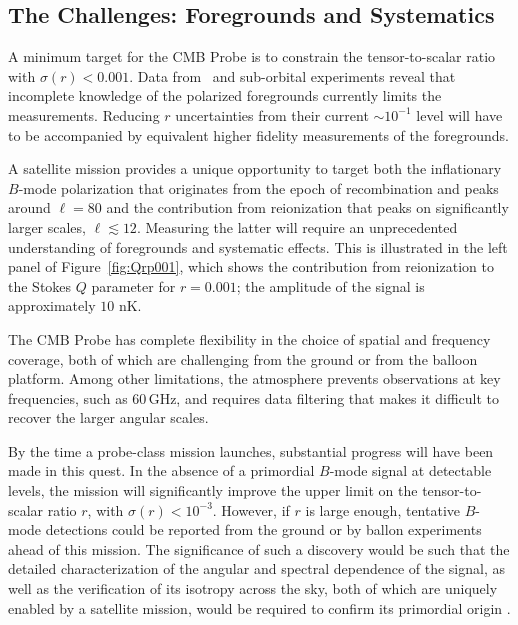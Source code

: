 \subsection{The Challenges: Foregrounds and Systematics}
\label{sec:foregrounds}
\vspace{-0.05in}

A minimum target for the CMB Probe is to constrain the tensor-to-scalar ratio with $\sigma(r) < 0.001$. Data from \planck\ and 
sub-orbital experiments reveal that incomplete knowledge of the polarized foregrounds currently limits the measurements. 
Reducing $r$ uncertainties from their current $\sim\!10^{-1}$ level will have to be accompanied by equivalent higher fidelity measurements of the foregrounds.

A satellite mission provides a unique opportunity to target both the inflationary $B$-mode polarization that originates from the epoch of recombination and peaks around $\ell=80$ and the contribution from reionization that peaks on significantly larger scales, $\ell\lesssim 12$. Measuring the latter will require an unprecedented understanding of foregrounds and systematic effects. This is illustrated in the left panel of Figure~\ref{fig:Qrp001}, which shows the contribution from reionization to the Stokes $Q$ parameter for $r=0.001$; the amplitude of the signal is approximately $10$ nK.


The CMB Probe has complete flexibility in the choice of spatial and frequency coverage, both of which are challenging from the ground or from the balloon platform.  Among other limitations, the atmosphere prevents observations at key frequencies, such as 60\,GHz, and requires data filtering that makes it difficult to recover the larger angular scales.

By the time a probe-class mission launches, substantial progress will
have been made in this quest.  In the absence of a primordial $B$-mode
signal at detectable levels, the mission will significantly improve
the upper limit on the tensor-to-scalar ratio $r$, with
$\sigma(r)<10^{-3}$.  However, if $r$ is large enough,
tentative $B$-mode detections could be reported from the ground or by
ballon experiments ahead of this mission. The significance of such a
discovery would be such that the detailed characterization of the
angular and spectral dependence of the signal, as well as the
verification of its isotropy across the sky, both of which are
uniquely enabled by a satellite mission, would be required to confirm
its primordial origin .

